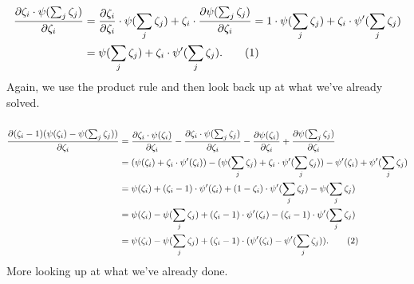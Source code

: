 \documentclass[12pt]{article}
\newcommand\numberthis{\addtocounter{equation}{1}\tag{\theequation}}
\begin{document}
\begin{align*}
    \frac{\partial \zeta_{i}\cdot\psi(\sum_{j} \zeta_{j})}{\partial \zeta_{i}}
    &=
    \frac{\partial \zeta_{i}}{\partial \zeta_{i}} \cdot \psi(\sum_{j} \zeta_{j})
    +
    \zeta_{i} \cdot \frac{\partial \psi(\sum_{j} \zeta_{j})}{\partial \zeta_{i}}
    = 1 \cdot \psi(\sum_{j} \zeta_{j}) + \zeta_{i} \cdot
    \psi'(\sum_{j} \zeta_{j})
    \\ &= \psi(\sum_{j} \zeta_{j}) + \zeta_{i} \cdot \psi'(\sum_{j} \zeta_{j}).
    \numberthis
\end{align*}
Again, we use the product rule and then look back up at what we've already
solved.

\subsubsection{}

\begin{align*}
    \frac{\partial (\zeta_{i} - 1)(\psi(\zeta_{i}) - \psi(\sum_{j} \zeta_{j}))}
    {\partial \zeta_{i}}
    & =
    \frac{\partial \zeta_{i}\cdot\psi(\zeta_{i})}{\partial \zeta_{i}} -
    \frac{\partial \zeta_{i}\cdot\psi(\sum_{j} \zeta_{j})}{\partial \zeta_{i}} -
    \frac{\partial \psi(\zeta_{i})}{\partial \zeta_{i}} +
    \frac{\partial \psi(\sum_{j} \zeta_{j})}{\partial \zeta_{i}}
    \\ & =
    (\psi(\zeta_{i}) + \zeta_{i}\cdot\psi'(\zeta_{i})) -
    (\psi(\sum_{j}\zeta_{j}) + \zeta_{i}\cdot\psi'(\sum_{j}\zeta_{j})) -
    \psi'(\zeta_{i}) + \psi'(\sum_{j}\zeta_{j})
    \\ & =
    \psi(\zeta_{i}) + (\zeta_{i} - 1)\cdot\psi'(\zeta_{i})
    + (1 - \zeta_{i}) \cdot \psi'(\sum_{j}\zeta_{j}) - \psi(\sum_{j}\zeta_{j})
    \\ & =
    \psi(\zeta_{i}) - \psi(\sum_{j} \zeta_{j}) + (\zeta_{i} - 1) \cdot
    \psi'(\zeta_{i}) - (\zeta_{i} - 1) \cdot \psi'(\sum_{j} \zeta_{j})
    \\ & =
    \psi(\zeta_{i}) - \psi(\sum_{j} \zeta_{j}) + (\zeta_{i} - 1) \cdot
    (\psi'(\zeta_{i}) - \psi'(\sum_{j} \zeta_{j})).
    \numberthis
\end{align*}
More looking up at what we've already done.

\subsubsection{}
\end{document}
